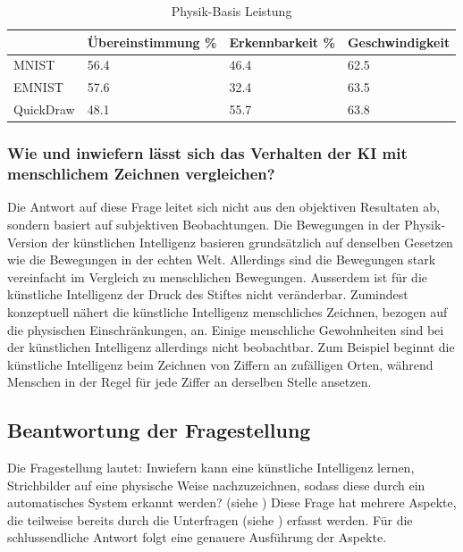 \begin{table}[!ht]
   \centering
   \caption{Physik-Basis Leistung}\label{tab:Phy-3-datasets}
   \begin{tabular}{|l|l|l|l|}
       \hline
           ~ & Übereinstimmung \% & Erkennbarkeit \% & Geschwindigkeit \\ \hline
           MNIST  & 56.4 & 46.4 & 62.5 \\ \hline
           EMNIST & 57.6 & 32.4 & 63.5 \\ \hline
           QuickDraw & 48.1 & 55.7 & 63.8 \\ \hline
       \end{tabular}
\end{table}
 
 
\subsubsection*{Wie und inwiefern lässt sich das Verhalten der KI mit menschlichem Zeichnen vergleichen?}\label{subsub:d_frage_unter_6}
Die Antwort auf diese Frage leitet sich nicht aus den objektiven Resultaten ab,
sondern basiert auf subjektiven Beobachtungen. Die Bewegungen in der
Physik-Version der künstlichen Intelligenz basieren grundsätzlich auf denselben
Gesetzen wie die Bewegungen in der echten Welt. Allerdings sind die Bewegungen
stark vereinfacht im Vergleich zu menschlichen Bewegungen. Ausserdem ist für die
künstliche Intelligenz der Druck des Stiftes nicht veränderbar. Zumindest
konzeptuell nähert die künstliche Intelligenz menschliches Zeichnen,
bezogen auf die physischen Einschränkungen, an. Einige menschliche Gewohnheiten
sind bei der künstlichen Intelligenz allerdings nicht beobachtbar. Zum Beispiel
beginnt die künstliche Intelligenz beim Zeichnen von Ziffern an zufälligen
Orten, während Menschen in der Regel für jede Ziffer an derselben Stelle
ansetzen.
 
 
\subsection{Beantwortung der Fragestellung}\label{sub:d_frage_frag}
Die Fragestellung lautet: Inwiefern kann eine künstliche Intelligenz lernen,
Strichbilder auf eine physische Weise nachzuzeichnen, sodass diese durch ein
automatisches System erkannt werden? (siehe ) Diese Frage
hat mehrere Aspekte, die teilweise bereits durch die Unterfragen (siehe
) erfasst werden. Für die schlussendliche Antwort
folgt eine genauere Ausführung der Aspekte.
 
